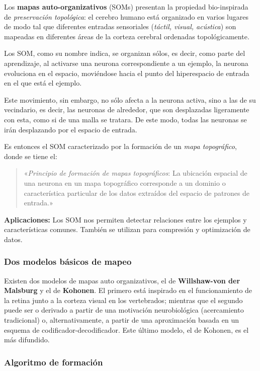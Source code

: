 \documentclass[10pt,a4paper]{article}
\begin{document}
Los \textbf{mapas auto-organizativos} (SOMs) presentan la propiedad bio-inspirada de \textit{preservación topológica}: el cerebro humano está organizado en varios lugares de modo tal que diferentes entradas sensoriales (\textit{táctil, visual, acústica}) son mapeadas en diferentes áreas de la corteza cerebral ordenadas topológicamente.

Los SOM, como su nombre indica, se organizan sólos, es decir, como parte del aprendizaje, al activarse una neurona correspondiente a un ejemplo, la neurona evoluciona en el espacio, moviéndose hacia el punto del hiperespacio de entrada en el que está el ejemplo.

Este movimiento, sin embargo, no sólo afecta a la neurona activa, sino a las de su vecindario, es decir, las neuronas de alrededor, que son desplazadas ligeramente con esta, como si de una malla se tratara. De este modo, todas las neuronas se irán desplazando por el espacio de entrada.

Es entonces el SOM caracterizado por la formación de un \textit{mapa topográfico}, donde se tiene el:
\begin{quote}
«\textit{Principio de formación de mapas topográficos}: La ubicación espacial de una neurona en un mapa topográfico corresponde a un dominio o característica particular de los datos extraídos del espacio de patrones de entrada.»
\end{quote}

\textbf{Aplicaciones:} Los SOM nos permiten detectar relaciones entre los ejemplos y características comunes. También se utilizan para compresión y optimización de datos.

\subsubsection{Dos modelos básicos de mapeo}

Existen dos modelos de mapas auto organizativos, el de \textbf{Willshaw-von der Malsburg} y el de \textbf{Kohonen}. El primero está inspirado en el funcionamiento de la retina junto a la corteza visual en los vertebrados; mientras que el segundo puede ser o derivado a partir de una motivación neurobiológica (acercamiento tradicional) o, alternativamente, a partir de una aproximación basada en un esquema de codificador-decodificador. Este último modelo, el de Kohonen, es el más difundido.

\subsubsection{Algoritmo de formación}
\end{document}

